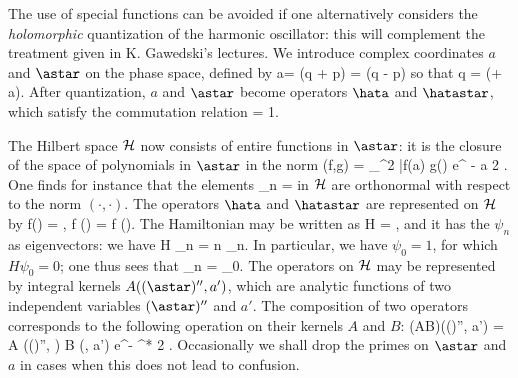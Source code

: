 The use of special functions can be avoided if one
alternatively considers
the {\em holomorphic} quantization of the harmonic oscillator:
this will complement the 
treatment given in K. Gawedski's lectures. 
We introduce complex coordinates
$a$ and $\astar$ on the phase space, defined by 
\beq  a= \normfac (\omega q + \isq p) \eeq
\beq \astar = \normfac (\omega q - \isq p) \eeq
so that
\beq q = \normfac (\astar + a). \eeq
After quantization, $a$ and $\astar $ become operators $\hata$ and 
$\hatastar$, which satisfy the commutation   relation
\beq [\hata, \hatastar ] = 1. \eeq

The Hilbert space ${\mbox{$\cal H$}}$ now consists of entire functions in 
$\astar$: it is the closure of the space of polynomials
in $\astar$ in the norm 
\beq \label{normastar}
(f,g) = \int_{\RR^2} 
 \bar{f}(a) g(\astar) e^{ - \astar a} 
{2 \pi \isq}. \eeq %
One finds for instance that the elements 
\beq \psi_n =  \eeq
in ${\mbox{$\cal H$}}$ are orthonormal with respect to the norm $( \cdot, \cdot )$. 
The operators $\hata$ and $\hatastar$ are represented on 
${\mbox{$\cal H$}}$ by 
\beq \hata f(\astar)  = , \eeq
\beq \hatastar f (\astar)  = \astar \cdot f (\astar). \eeq
The Hamiltonian may be written as 
\beq H = \omega \hatastar \hata, \eeq
and it has the $\psi_n$ as eigenvectors: we have
\beq H \psi_n = n \omega \psi_n.  \eeq
In particular, we have $\psi_0 = 1$, for which $H \psi_0 = 0 $; 
one thus sees that 
\beq \psi_n =  { } \psi_0. \eeq
The operators on ${\mbox{$\cal H$}}$ may be represented by integral 
kernels $A((\astar)'', a')$, which are analytic functions
of two independent variables $(\astar)''$ and $a'$. 
The composition  of two operators corresponds to 
the following operation on their kernels $A$ and $B$:
\beq (AB)((\astar)'', a') = \int A ((\astar)'', \alpha) B (\alpha, a') 
e^{- \alpha^* \alpha}  {2 \pi \isq}. \eeq
Occasionally we shall drop the primes on $\astar$ and $a$ in cases when 
this does not lead to confusion.

